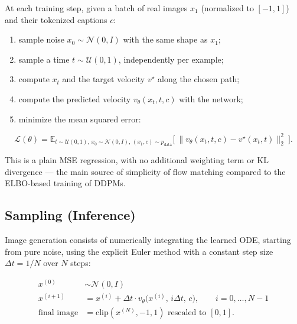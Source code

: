 \documentclass[11pt,a4paper]{article}
\begin{document}
At each training step, given a batch of real images $x_1$ (normalized to
$[-1,1]$) and their tokenized captions $c$:
\begin{enumerate}
  \item sample noise $x_0 \sim \mathcal{N}(0, I)$ with the same shape as
        $x_1$;
  \item sample a time $t \sim \mathcal{U}(0,1)$, independently per example;
  \item compute $x_t$ and the target velocity $v^\star$ along the chosen
        path;
  \item compute the predicted velocity $v_\theta(x_t, t, c)$ with the
        network;
  \item minimize the mean squared error:
\end{enumerate}
\[
  \mathcal{L}(\theta) = \mathbb{E}_{t\sim\mathcal{U}(0,1),\, x_0\sim\mathcal{N}(0,I),\, (x_1,c)\sim p_{\mathrm{data}}}
  \Big[\ \big\| v_\theta(x_t, t, c) - v^\star(x_t, t) \big\|_2^2\ \Big].
\]

This is a plain MSE regression, with no additional weighting term or KL
divergence — the main source of simplicity of flow matching compared to the
ELBO-based training of DDPMs.

\subsection{Sampling (Inference)}

Image generation consists of numerically integrating the learned ODE,
starting from pure noise, using the explicit Euler method with a constant
step size $\Delta t = 1/N$ over $N$ steps:

\begin{align*}
  x^{(0)} &\sim \mathcal{N}(0, I) \\
  x^{(i+1)} &= x^{(i)} + \Delta t \cdot v_\theta\big(x^{(i)},\, i\Delta t,\, c\big),
  \qquad i = 0, \dots, N-1 \\
  \text{final image} &= \mathrm{clip}(x^{(N)}, -1, 1) \text{ rescaled to } [0,1].
\end{align*}
\end{document}
